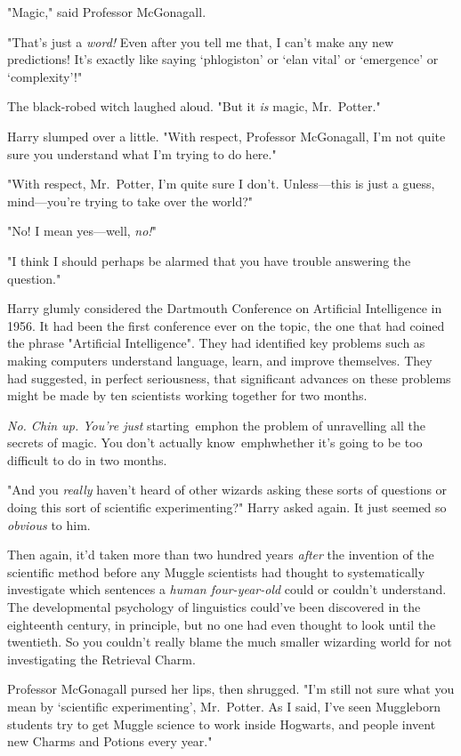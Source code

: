 "Magic," said Professor McGonagall.

"That's just a \emph{word!} Even after you tell me that, I can't make any new 
predictions! It's exactly like saying `phlogiston' or `elan vital' or 
`emergence' or `complexity'!"

The black-robed witch laughed aloud. "But it \emph{is} magic, Mr.~Potter."

Harry slumped over a little. "With respect, Professor McGonagall, I'm not quite 
sure you understand what I'm trying to do here."

"With respect, Mr.~Potter, I'm quite sure I don't. Unless---this is just a 
guess, mind---you're trying to take over the world?"

"No! I mean yes---well, \emph{no!}"

"I think I should perhaps be alarmed that you have trouble answering the 
question."

Harry glumly considered the Dartmouth Conference on Artificial Intelligence in 
1956. It had been the first conference ever on the topic, the one that had 
coined the phrase "Artificial Intelligence". They had identified key problems 
such as making computers understand language, learn, and improve themselves. 
They had suggested, in perfect seriousness, that significant advances on these 
problems might be made by ten scientists working together for two months.

\emph{No. Chin up. You're just} starting\ emph{on the problem of unravelling 
all the secrets of magic. You don't actually} know\ emph{whether it's going to 
be too difficult to do in two months.}

"And you \emph{really} haven't heard of other wizards asking these sorts of 
questions or doing this sort of scientific experimenting?" Harry asked again. 
It just seemed so \emph{obvious} to him.

Then again, it'd taken more than two hundred years \emph{after} the invention 
of the scientific method before any Muggle scientists had thought to 
systematically investigate which sentences a \emph{human four-year-old} could 
or couldn't understand. The developmental psychology of linguistics could've 
been discovered in the eighteenth century, in principle, but no one had even 
thought to look until the twentieth. So you couldn't really blame the much 
smaller wizarding world for not investigating the Retrieval Charm.

Professor McGonagall pursed her lips, then shrugged. "I'm still not sure what 
you mean by `scientific experimenting', Mr.~Potter. As I said, I've seen 
Muggleborn students try to get Muggle science to work inside Hogwarts, and 
people invent new Charms and Potions every year."

